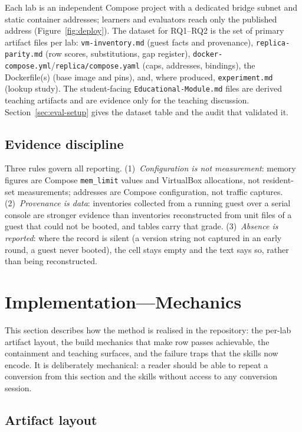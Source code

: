 \documentclass[3p,twocolumn,authoryear]{elsarticle}
\begin{document}
Each lab is an independent Compose project with a dedicated bridge
subnet and static container addresses; learners and evaluators reach
only the published address (Figure~\ref{fig:deploy}). The dataset for
RQ1--RQ2 is the set of primary artifact files per lab:
\texttt{vm-inventory.md} (guest facts and provenance),
\texttt{replica-parity.md} (row scores, substitutions, gap register),
\texttt{docker-compose.yml}/\texttt{replica/compose.yaml} (caps,
addresses, bindings), the Dockerfile(s) (base image and pins), and,
where produced, \texttt{experiment.md} (lookup study). The
student-facing \texttt{Educational-Module.md} files are derived
teaching artifacts and are evidence only for the teaching discussion.
Section~\ref{sec:eval-setup} gives the dataset table and the audit
that validated it.

\subsection{Evidence discipline}

Three rules govern all reporting. (1)~\emph{Configuration is not
measurement}: memory figures are Compose \texttt{mem\_limit} values and
VirtualBox allocations, not resident-set measurements; addresses are
Compose configuration, not traffic captures. (2)~\emph{Provenance is
data}: inventories collected from a running guest over a serial console
are stronger evidence than inventories reconstructed from unit files of
a guest that could not be booted, and tables carry that grade.
(3)~\emph{Absence is reported}: where the record is silent (a version
string not captured in an early round, a guest never booted), the cell
stays empty and the text says so, rather than being reconstructed.


\section{Implementation---Mechanics}
\label{sec:impl}

This section describes how the method is realised in the repository:
the per-lab artifact layout, the build mechanics that make row passes
achievable, the containment and teaching surfaces, and the failure
traps that the skills now encode. It is deliberately mechanical: a
reader should be able to repeat a conversion from this section and the
skills without access to any conversion session.

\subsection{Artifact layout}
\end{document}
